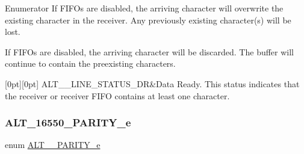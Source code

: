 \begin{DoxyEnumFields}{Enumerator}
If F\+I\+F\+Os are disabled, the arriving character will overwrite the existing character in the receiver. Any previously existing character(s) will be lost.

If F\+I\+F\+Os are disabled, the arriving character will be discarded. The buffer will continue to contain the preexisting characters. \\
\hline

[0pt][0pt]{}\mbox{\label{group__UART__LINE_gga9bd71509496adb0f07549c10d42ff745a04da1ad7857dc7152c136c8a4dc34024}} 
A\+L\+T\+\_\+\_\+\+L\+I\+N\+E\+\_\+\+S\+T\+A\+T\+U\+S\+\_\+\+DR&Data Ready. This status indicates that the receiver or receiver F\+I\+FO contains at least one character. \\
\hline

\end{DoxyEnumFields}
\mbox{\label{group__UART__LINE_ga8ac3151dbe5902aca34e2a07ff9747b1}} 
\subsubsection{\texorpdfstring{ALT\_16550\_PARITY\_e}{ALT\_16550\_PARITY\_e}}
{\footnotesize\ttfamily enum \mbox{\hyperlink{group__UART__LINE_ga8ac3151dbe5902aca34e2a07ff9747b1}{A\+L\+T\+\_\+\_\+\+P\+A\+R\+I\+T\+Y\+\_\+e}}}

